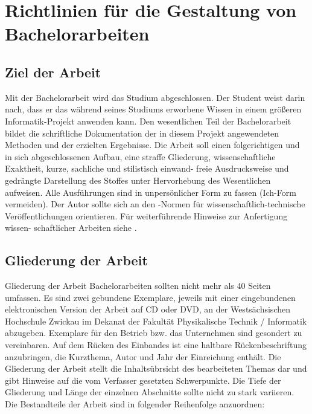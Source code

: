 \chapter{Richtlinien für die Gestaltung von Bachelorarbeiten}
\label{chap:richtlinien}

\section{Ziel der Arbeit}
\label{sec:ziel}
Mit der Bachelorarbeit wird das Studium abgeschlossen. Der Student weist darin
nach, dass er das während seines Studiums erworbene Wissen in einem größeren
Informatik-Projekt anwenden kann. Den wesentlichen Teil der Bachelorarbeit bildet
die schriftliche Dokumentation der in diesem Projekt angewendeten Methoden und
der erzielten Ergebnisse.
Die Arbeit soll einen folgerichtigen und in sich abgeschlossenen Aufbau, eine straffe
Gliederung, wissenschaftliche Exaktheit, kurze, sachliche und stilistisch einwand-
freie Ausdrucksweise und gedrängte Darstellung des Stoffes unter Hervorhebung des
Wesentlichen aufweisen. Alle Ausführungen sind in unpersönlicher Form zu fassen
(Ich-Form vermeiden).
Der Autor sollte sich an den -Normen für wissenschaftlich-technische Veröffentlichungen 
\cite{DIN05} orientieren. Für weiterführende Hinweise zur Anfertigung wissen-
schaftlicher Arbeiten siehe \cite{Rec06,Bri07,DLLS05}.

\section{Gliederung der Arbeit}
\label{sec:gliederung}

Gliederung der Arbeit
Bachelorarbeiten sollten nicht mehr als 40 Seiten umfassen. Es sind zwei gebundene
Exemplare, jeweils mit einer eingebundenen elektronischen Version der Arbeit auf
CD oder DVD, an der Westsächsischen Hochschule Zwickau im Dekanat der Fakultät
Physikalische Technik / Informatik abzugeben. Exemplare für den Betrieb bzw. das
Unternehmen sind gesondert zu vereinbaren.
Auf dem Rücken des Einbandes ist eine haltbare Rückenbeschriftung anzubringen,
die Kurzthema, Autor und Jahr der Einreichung enthält. 
Die Gliederung der Arbeit stellt die Inhaltsübrsicht des bearbeiteten Themas dar
und gibt Hinweise auf die vom Verfasser gesetzten Schwerpunkte.
Die Tiefe der Gliederung und Länge der einzelnen Abschnitte sollte nicht zu stark
variieren. Die Bestandteile der Arbeit sind in folgender Reihenfolge anzuordnen:\\

